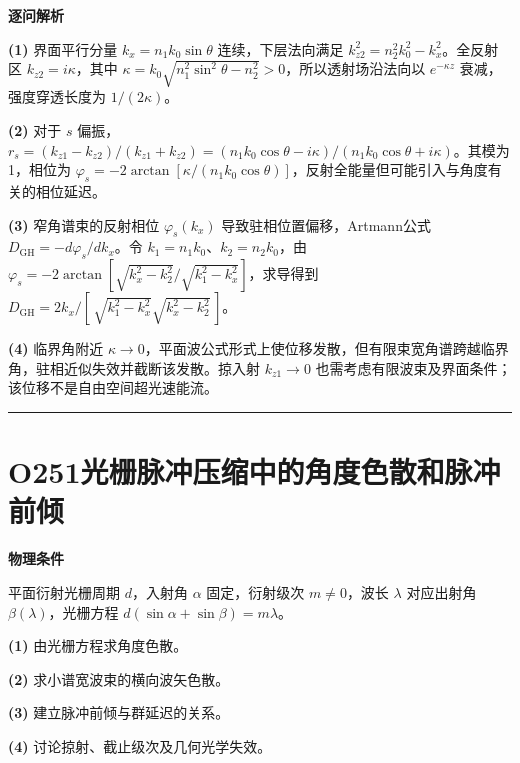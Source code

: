 \documentclass[UTF8,a4paper,11pt,oneside,openany]{ctexbook}
\begin{document}
\par\medskip\noindent\textbf{逐问解析}
\par\noindent\textbf{(1)} 界面平行分量 \(k_x=n_1k_0\sin\theta\) 连续，下层法向满足 \(k_{z2}^2=n_2^2k_0^2-k_x^2\)。全反射区 \(k_{z2}=i\kappa\)，其中 \(\kappa=k_0\sqrt{n_1^2\sin^2\theta-n_2^2}>0\)，所以透射场沿法向以 \(e^{-\kappa z}\) 衰减，强度穿透长度为 \(1/(2\kappa)\)。
\par\noindent\textbf{(2)} 对于 \(s\) 偏振，\(r_s=(k_{z1}-k_{z2})/(k_{z1}+k_{z2})=(n_1k_0\cos\theta-i\kappa)/(n_1k_0\cos\theta+i\kappa)\)。其模为1，相位为 \(\varphi_s=-2\arctan[\kappa/(n_1k_0\cos\theta)]\)，反射全能量但可能引入与角度有关的相位延迟。
\par\noindent\textbf{(3)} 窄角谱束的反射相位 \(\varphi_s(k_x)\) 导致驻相位置偏移，Artmann公式 \(D_{\mathrm{GH}}=-d\varphi_s/dk_x\)。令 \(k_1=n_1k_0\)、\(k_2=n_2k_0\)，由 \(\varphi_s=-2\arctan[\sqrt{k_x^2-k_2^2}/\sqrt{k_1^2-k_x^2}]\)，求导得到 \(D_{\mathrm{GH}}=2k_x/[\,\sqrt{k_1^2-k_x^2}\sqrt{k_x^2-k_2^2}\,]\)。
\par\noindent\textbf{(4)} 临界角附近 \(\kappa\to0\)，平面波公式形式上使位移发散，但有限束宽角谱跨越临界角，驻相近似失效并截断该发散。掠入射 \(k_{z1}\to0\) 也需考虑有限波束及界面条件；该位移不是自由空间超光速能流。

\par\bigskip\hrule\bigskip
\section*{O251\quad 光栅脉冲压缩中的角度色散和脉冲前倾}
\textbf{物理条件}\par 平面衍射光栅周期 \(d\)，入射角 \(\alpha\) 固定，衍射级次 \(m\ne0\)，波长 \(\lambda\) 对应出射角 \(\beta(\lambda)\)，光栅方程 \(d(\sin\alpha+\sin\beta)=m\lambda\)。
\par\noindent\textbf{(1)} 由光栅方程求角度色散。
\par\noindent\textbf{(2)} 求小谱宽波束的横向波矢色散。
\par\noindent\textbf{(3)} 建立脉冲前倾与群延迟的关系。
\par\noindent\textbf{(4)} 讨论掠射、截止级次及几何光学失效。
\end{document}

